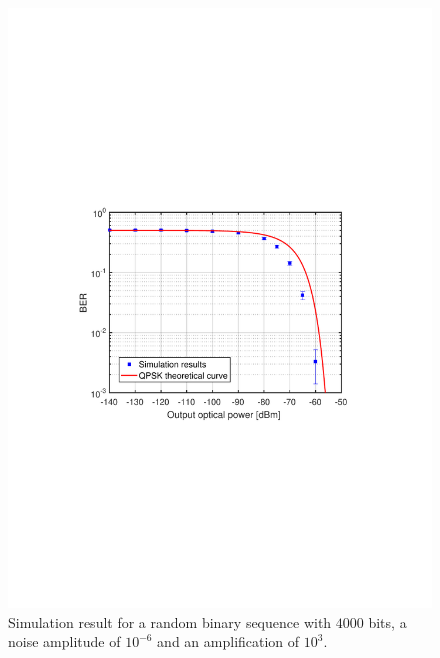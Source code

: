 \begin{figure}[h]
	\centering
	\includegraphics[clip, trim=0.5cm 9cm 0.5cm 9cm, width=\textwidth]{./sdf/m_qam_system/figures/BER_QPSK_sim_pseudorandom7.pdf}
	\caption{Simulation result for a random binary sequence with $4000$ bits, a noise amplitude of $10^{-6}$ and an amplification of $10^3$.}
	\label{fig:ber_pseudorandom}
\end{figure}%